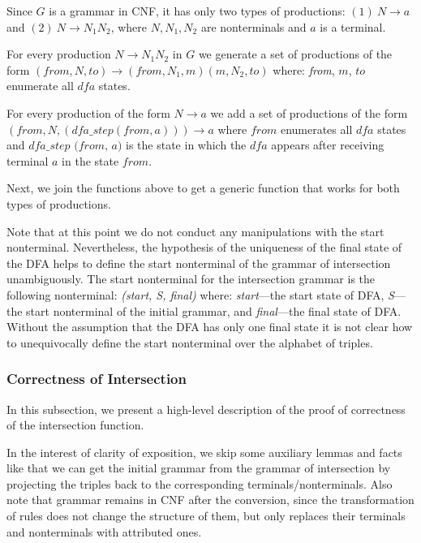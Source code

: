 \documentclass[runningheads]{llncs}
\begin{document}
Since $G$ is a grammar in CNF, it has only two types of productions: $(1)\ N \to a $ and $(2) \ N \to N_{1} N_{2}$, where $N, N_1, N_2$ are nonterminals and $a$ is a terminal.

For every production $N \to N_1 N_2$ in $G$ we generate a set of productions of the form $(\textit{from}, N, to) \to (\textit{from}, N_1,  m) (m, N_2, to)$ where: \textit{from}, $m$, $to$ enumerate all $\textit{dfa}$ states.

For every production of the form $N \to a$ we add a set of productions of the form $(\textit{from}, N, (\textit{dfa\_step}(\textit{from}, a))) \to a$ where $\textit{from}$ enumerates all $\textit{dfa}$ states and $\textit{dfa\_step (from, a)}$ is the state in which the $\textit{dfa}$ appears after receiving terminal $a$ in the state $\textit{from}$.

Next, we join the functions above to get a generic function that works for both types of productions.

Note that at this point we do not conduct any manipulations with the start nonterminal. Nevertheless, the hypothesis of the uniqueness of the final state of the DFA helps to define the start nonterminal of the grammar of intersection unambiguously. The start nonterminal for the intersection grammar is the following nonterminal: \textit{(start, S, final)} where: \textit{start}---the start state of DFA, \textit{S}---the start nonterminal of the initial grammar, and \textit{final}---the final state of DFA. Without the assumption that the DFA has only one final state it is not clear how to unequivocally define the start nonterminal over the alphabet of triples.

\subsubsection{Correctness of Intersection}
\label{sec:correctintersection}

In this subsection, we present a high-level description of the proof of correctness of the intersection function.

In the interest of clarity of exposition, we skip some auxiliary lemmas and facts like that we can get the initial grammar from the grammar of intersection by projecting the triples back to the corresponding terminals/nonterminals. Also note that grammar remains in CNF after the conversion, since the transformation of rules does not change the structure of them, but only replaces their terminals and nonterminals with attributed ones.
\end{document}
